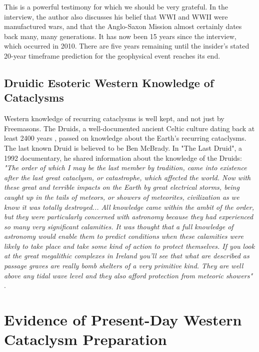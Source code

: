 \documentclass[10pt,twocolumn,letterpaper]{article}
\begin{document}
This is a powerful testimony for which we should be very grateful. In the interview, the author also discusses his belief that WWI and WWII were manufactured wars, and that the Anglo-Saxon Mission almost certainly dates back many, many generations. It has now been 15 years since the interview, which occurred in 2010. There are five years remaining until the insider's stated 20-year timeframe prediction for the geophysical event reaches its end.

\subsection{Druidic Esoteric Western Knowledge of Cataclysms}

Western knowledge of recurring cataclysms is well kept, and not just by Freemasons. The Druids, a well-documented ancient Celtic culture dating back at least 2400 years \cite{7}, passed on knowledge about the Earth's recurring cataclysms. The last known Druid is believed to be Ben McBrady. In "The Last Druid", a 1992 documentary, he shared information about the knowledge of the Druids: \textit{"The order of which I may be the last member by tradition, came into existence after the last great cataclysm, or catastrophe, which affected the world. Now with these great and terrible impacts on the Earth by great electrical storms, being caught up in the tails of meteors, or showers of meteorites, civilization as we know it was totally destroyed... All knowledge came within the ambit of the order, but they were particularly concerned with astronomy because they had experienced so many very significant calamities. It was thought that a full knowledge of astronomy would enable them to predict conditions when these calamities were likely to take place and take some kind of action to protect themselves. If you look at the great megalithic complexes in Ireland you'll see that what are described as passage graves are really bomb shelters of a very primitive kind. They are well above any tidal wave level and they also afford protection from meteoric showers"} \cite{8,9}.


\section{Evidence of Present-Day Western Cataclysm Preparation}
\end{document}
